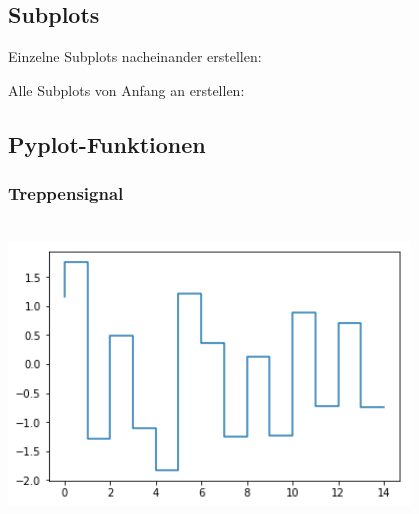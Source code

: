 %

\subsection{Subplots}
\begin{minipage}[t]{0.49\textwidth}
	Einzelne Subplots nacheinander erstellen:
	
\end{minipage}
\hspace{0.02\textwidth}
\begin{minipage}[t]{0.49\textwidth}
	Alle Subplots von Anfang an erstellen:
	
	
\end{minipage}


\begin{minipage}[t]{0.49\textwidth}
	\subsection{Pyplot-Funktionen}
	\subsubsection{Treppensignal}
	
\end{minipage}
\hspace{0.02\textwidth}
\begin{minipage}[t]{0.49\textwidth}
	$\quad$\\[1pt]
	\includegraphics[width=0.8\textwidth]{images/v9_matplotlib1}
\end{minipage}

